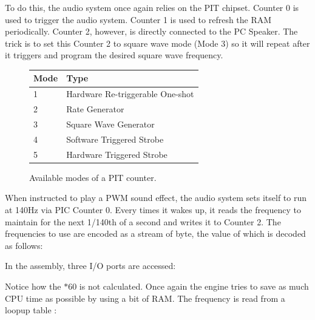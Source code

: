 To do this, the audio system once again relies on the PIT chipset. Counter 0 is used to trigger the audio system. Counter 1 is used to refresh the RAM periodically. Counter 2, however, is directly connected to the PC Speaker. The trick is to set this Counter 2 to square wave mode (Mode 3) so it will repeat after it triggers and program the desired square wave frequency. \\
\par
\begin{figure}[H]
\centering
\begin{tabularx}{\textwidth}{ X X  }
  \toprule
  \textbf{Mode} & \textbf{Type} \\ \bottomrule
1 & Hardware Re-triggerable One-shot\\
2 & Rate Generator\\
3 & Square Wave Generator\\
4 & Software Triggered Strobe\\
5 & Hardware Triggered Strobe\\
\bottomrule
\end{tabularx}
\caption{Available modes of a PIT counter.}
\end{figure}
\par 
When instructed to play a PWM sound effect, the audio system sets itself to run at 140Hz via PIC Counter 0. Every times it wakes up, it reads the frequency to maintain for the next 1/140th of a second and writes it to Counter 2. The frequencies to use are encoded as a stream of byte, the value of which is decoded as follows:\\
\par 
\begin{minipage}{\textwidth}

\end{minipage}
\par
In the assembly, three I/O ports are accessed:\\
\par
\begin{minipage}{\textwidth}

\end{minipage}
\par
Notice how the $ * 60$ is not calculated. Once again the engine tries to save as much CPU time as possible by using a bit of RAM. The frequency is read from a loopup table :\\
\par
\begin{minipage}{\textwidth}

\end{minipage}
